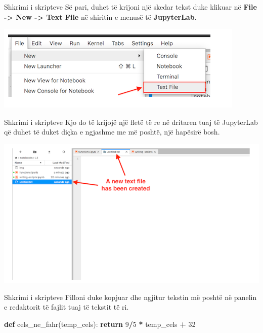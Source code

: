 \documentclass[
  ignorenonframetext,
]{beamer}
\newenvironment{Shaded}{\begin{snugshade}}{\end{snugshade}}
\newcommand{\ControlFlowTok}[1]{\textcolor[rgb]{0.13,0.29,0.53}{\textbf{#1}}}
\newcommand{\DecValTok}[1]{\textcolor[rgb]{0.00,0.00,0.81}{#1}}
\newcommand{\KeywordTok}[1]{\textcolor[rgb]{0.13,0.29,0.53}{\textbf{#1}}}
\newcommand{\NormalTok}[1]{#1}
\newcommand{\OperatorTok}[1]{\textcolor[rgb]{0.81,0.36,0.00}{\textbf{#1}}}
\begin{document}
\begin{frame}{Shkrimi i skripteve}
\protect\hypertarget{shkrimi-i-skripteve-3}{}
Së pari, duhet të krijoni një skedar tekst duke klikuar në \textbf{File
-\textgreater{} New -\textgreater{} Text File} në shiritin e menusë të
\textbf{JupyterLab}.

\includegraphics{./Figs/script1.png}
\end{frame}

\begin{frame}{Shkrimi i skripteve}
\protect\hypertarget{shkrimi-i-skripteve-4}{}
Kjo do të krijojë një fletë të re në dritaren tuaj të JupyterLab që
duhet të duket diçka e ngjashme me më poshtë, një hapësirë bosh.

\includegraphics{./Figs/script2.png}
\end{frame}

\begin{frame}[fragile]{Shkrimi i skripteve}
\protect\hypertarget{shkrimi-i-skripteve-5}{}
Filloni duke kopjuar dhe ngjitur tekstin më poshtë në panelin e
redaktorit të fajlit tuaj të tekstit të ri.

\begin{Shaded}
\begin{Highlighting}[]

\KeywordTok{def}\NormalTok{ cels\_ne\_fahr(temp\_cels):}
    \ControlFlowTok{return} \DecValTok{9}\OperatorTok{/}\DecValTok{5} \OperatorTok{*}\NormalTok{ temp\_cels }\OperatorTok{+} \DecValTok{32}
\end{Highlighting}
\end{Shaded}
\end{frame}
\end{document}
